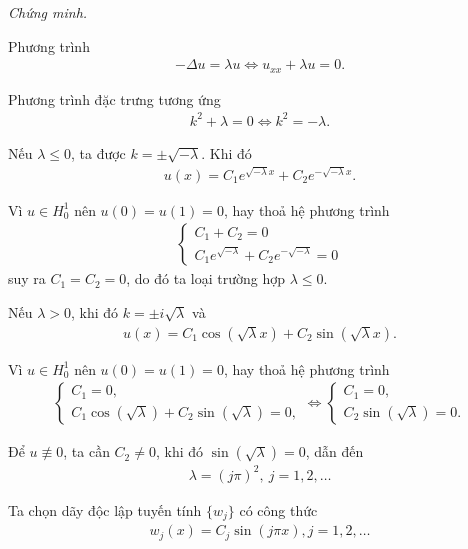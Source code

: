 \documentclass[12pt,a4paper]{article}
\theoremstyle{definition}
\begin{document}
\textit{Chứng minh.}

Phương trình
\begin{align*}
    -\Delta u = \lambda u \Leftrightarrow u_{xx} + \lambda u = 0.
\end{align*}

Phương trình đặc trưng tương ứng
\begin{align*}
    k^2 + \lambda = 0 \Leftrightarrow k^2 = -\lambda.
\end{align*}

Nếu $\lambda \le 0$, ta được $k = \pm\sqrt{-\lambda}$. Khi đó
\begin{align*}
    u(x) = C_1 e^{\sqrt{-\lambda} x} + C_2 e^{-\sqrt{-\lambda} x}.
\end{align*}

Vì $u \in H^1_0$ nên $u(0) = u(1) = 0$, hay thoả hệ phương trình
\begin{align*}
\begin{cases}
    C_1 + C_2 = 0 \\
    C_1 e^{\sqrt{-\lambda}} + C_2 e^{-\sqrt{-\lambda}} = 0
\end{cases}
\end{align*}
suy ra $C_1 = C_2 = 0$, do đó ta loại trường hợp $\lambda \le 0$.

Nếu $\lambda > 0$, khi đó $k = \pm i\sqrt{\lambda}$ và
\begin{align*}
    u(x) = C_1 \cos(\sqrt{\lambda}x) + C_2 \sin(\sqrt{\lambda}x).
\end{align*}

Vì $u \in H^1_0$ nên $u(0) = u(1) = 0$, hay thoả hệ phương trình
\begin{align*}
\begin{cases}
    C_1 = 0, \\
    C_1 \cos(\sqrt{\lambda}) + C_2 \sin(\sqrt{\lambda}) = 0,
\end{cases} \Leftrightarrow \begin{cases}
    C_1 = 0, \\
    C_2 \sin(\sqrt{\lambda}) = 0.
\end{cases}
\end{align*}

Để $u \not\equiv 0$, ta cần $C_2 \ne 0$, khi đó $\sin(\sqrt{\lambda}) = 0$, dẫn đến
\begin{align*}
    \lambda = (j\pi)^2, \: j = 1,2,\dots
\end{align*}

Ta chọn dãy độc lập tuyến tính $\{w_j\}$ có công thức
\begin{align*}
    w_j(x) = C_j \sin(j\pi x), j=1,2,\dots
\end{align*}
\end{document}
